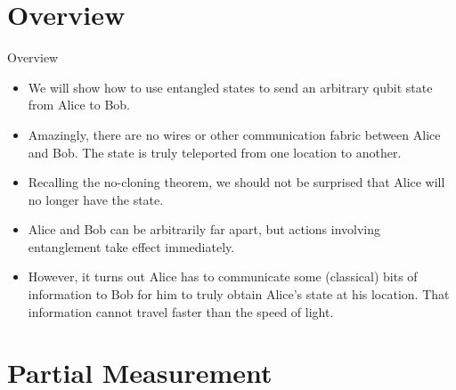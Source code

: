 
\section*{Overview}
\begin{frame}{Overview}
    \begin{itemize}[<+->]
        \item We will show how to use entangled states to send an arbitrary qubit state from Alice to Bob.
        \item Amazingly, there are no wires or other communication fabric between Alice and Bob.  The state is truly teleported from one location to another.
        \item Recalling the no-cloning theorem, we should not be surprised that Alice will no longer have the state.
        \item Alice and Bob can be arbitrarily far apart, but actions involving entanglement take effect immediately.
        \item However, it turns out Alice has to communicate some (classical) bits of information to Bob for him to truly obtain Alice's state at his location.  That information cannot travel faster than the speed of light.
    \end{itemize}
\end{frame}

\section*{Partial Measurement}

